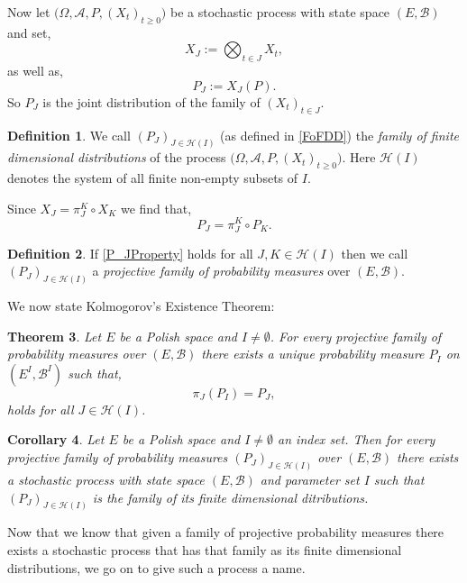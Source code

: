 \documentclass[a4paper, 12pt]{report}
\newtheorem{theorem}{Theorem}[section]
\newtheorem{corollary}[theorem]{Corollary}
\theoremstyle{remark}
\theoremstyle{definition}
\newtheorem{definition}[theorem]{Definition}
\begin{document}
Now let $\big(\Omega, \mathcal{A}, P, (X_t)_{t\ge 0}\big)$ be a stochastic process with state space $(E, \mathcal{B})$ and set,
$$
X_J := \bigotimes_{t \in J}X_t,
$$
as well as,
\begin{equation}\label{FoFDD}
P_J := X_J(P).
\end{equation}
So $P_J$ is the joint distribution of the family of $(X_t)_{t \in J}$.

\begin{definition}
We call $(P_J)_{J \in \mathcal{H}(I)}$ (as defined in \eqref{FoFDD}) the \emph{family of finite dimensional distributions} of the process $\big(\Omega, \mathcal{A}, P, (X_t)_{t\ge 0}\big)$.  Here $\mathcal{H}(I)$ denotes the system of all finite non-empty subsets of $I$.
\end{definition}
Since $X_J = \pi_J^K\circ X_K$ we find that,
\begin{equation}\label{P_JProperty}
P_J = \pi_J^K\circ P_K.
\end{equation}

\begin{definition}
If \eqref{P_JProperty} holds for all $J, K \in \mathcal{H}(I)$ then we call $(P_J)_{J \in \mathcal{H}(I)}$ a \emph{projective family of probability measures} over $(E, \mathcal{B})$.
\end{definition}
We now state Kolmogorov's Existence Theorem:

\begin{theorem}
Let $E$ be a Polish space and $I \ne \emptyset$.  For every projective family of probability measures over $(E, \mathcal{B})$ there exists a unique probability measure $P_I$ on $(E^I, \mathcal{B}^I)$ such that,
\begin{equation}
\pi_J(P_I) = P_J,
\end{equation}
holds for all $J \in \mathcal{H}(I)$.
\end{theorem}

\begin{corollary}
Let $E$ be a Polish space and $I \ne \emptyset$ an index set.  Then for every projective family of probability measures $(P_J)_{J \in \mathcal{H}(I)}$ over $(E, \mathcal{B})$ there exists a stochastic process with state space $(E, \mathcal{B})$ and parameter set $I$ such that $(P_J)_{J \in \mathcal{H}(I)}$ is the family of its finite dimensional ditributions.
\end{corollary}

Now that we know that given a family of projective probability measures there exists a stochastic process that has that family as its finite dimensional distributions, we go on to give such a process a name.
\end{document}
